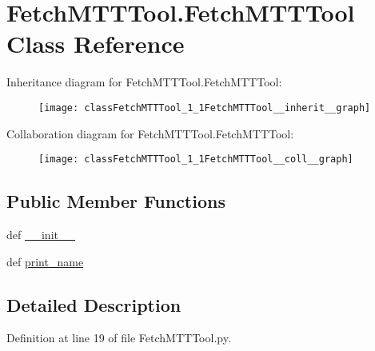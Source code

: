 \hypertarget{classFetchMTTTool_1_1FetchMTTTool}{\section{Fetch\-M\-T\-T\-Tool.\-Fetch\-M\-T\-T\-Tool Class Reference}
\label{classFetchMTTTool_1_1FetchMTTTool}
}


Inheritance diagram for Fetch\-M\-T\-T\-Tool.\-Fetch\-M\-T\-T\-Tool\-:\nopagebreak
\begin{figure}[H]
\begin{center}
\leavevmode
\texttt{[image: classFetchMTTTool\_1\_1FetchMTTTool\_\_inherit\_\_graph]}
\end{center}
\end{figure}


Collaboration diagram for Fetch\-M\-T\-T\-Tool.\-Fetch\-M\-T\-T\-Tool\-:\nopagebreak
\begin{figure}[H]
\begin{center}
\leavevmode
\texttt{[image: classFetchMTTTool\_1\_1FetchMTTTool\_\_coll\_\_graph]}
\end{center}
\end{figure}
\subsection*{Public Member Functions}
\begin{DoxyCompactItemize}
\item 
def \hyperlink{classFetchMTTTool_1_1FetchMTTTool_ac23a2c73d6f9eb2edcd7fcdae09c7b8c}{\-\_\-\-\_\-init\-\_\-\-\_\-}
\item 
def \hyperlink{classFetchMTTTool_1_1FetchMTTTool_a9b335ae2c3b15ef427fc70aa0510ae40}{print\-\_\-name}
\end{DoxyCompactItemize}


\subsection{Detailed Description}


Definition at line 19 of file Fetch\-M\-T\-T\-Tool.\-py.



